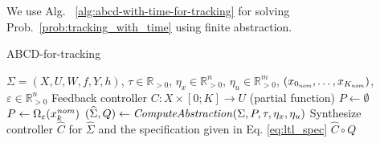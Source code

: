 We use Alg.~ \ref{alg:abcd-with-time-for-tracking} for solving Prob.~\ref{prob:tracking_with_time} using finite abstraction.




\begin{algorithm}
	\caption{ABCD-for-tracking}
	\label{alg:abcd-with-time-for-tracking}
	\begin{algorithmic}[1]
		\Require $\Sigma=(X,U,W,f,Y,h)$, $\tau \in \mathbb{R}_{>0}$, $\eta_x\in \mathbb{R}^n_{>0}$, $\eta_u\in \mathbb{R}^m_{>0}$, $(x_{0_{\mathit{nom}}},\ldots,x_{K_{\mathit{nom}}})$, $\varepsilon \in \mathbb{R}_{>0}^{n}$
		\Ensure Feedback controller $C\colon X\times [0;K]\to U$ (partial function)
		\State $P \gets \emptyset$
		\State $P \gets \Omega_{\varepsilon}(x_k^{\mathit{nom}})$
		\EndFor
		\State $(\widehat{\Sigma},Q) \gets \mathit{ComputeAbstraction}(\Sigma, P, \tau, \eta_{x} , \eta_u)$
		\State Synthesize controller $\widehat{C}$ for $\widehat{\Sigma}$ and the specification given in Eq. \eqref{eq:ltl_spec} %
		\State \Return $\widehat{C}\circ Q$
	\end{algorithmic}
\end{algorithm}

